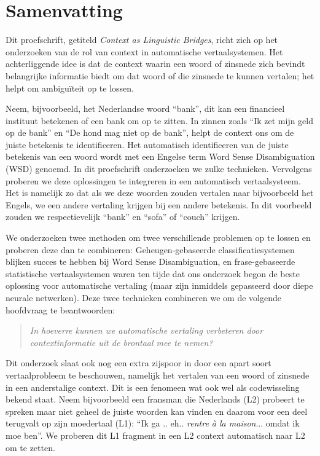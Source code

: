 \chapter*{Samenvatting}

Dit proefschrift, getiteld \emph{Context as Linguistic Bridges}, richt zich op het onderzoeken van de rol van context in
automatische vertaalsystemen. Het achterliggende idee is dat de context waarin een woord of zinsnede zich bevindt
belangrijke informatie biedt om dat woord of die zinsnede te kunnen vertalen; het helpt om ambiguïteit op te lossen.

Neem, bijvoorbeeld, het Nederlandse woord ``bank'', dit kan een financieel instituut betekenen of een bank om op te
zitten. In zinnen zoals ``Ik zet mijn geld op de bank'' en ``De hond mag niet op de bank'', helpt de context ons om de
juiste betekenis te identificeren. Het automatisch identificeren van de juiste betekenis van een woord wordt met een
Engelse term  Word Sense Disambiguation (WSD) genoemd. In dit proefschrift onderzoeken we zulke technieken.
Vervolgens proberen we deze oplossingen te integreren in een automatisch vertaalsysteem. Het is namelijk zo dat als we
deze woorden zouden vertalen naar bijvoorbeeld het Engels, we een andere vertaling krijgen bij een andere betekenis. In
dit voorbeeld zouden we respectievelijk ``bank'' en ``sofa'' of ``couch'' krijgen.

We onderzoeken twee methoden om twee verschillende problemen op te lossen en proberen deze dan te
combineren: Geheugen-gebaseerde classificatiesystemen blijken succes te hebben bij Word Sense Disambiguation, en
frase-gebaseerde statistische vertaalsystemen waren ten tijde dat ons onderzoek begon de beste oplossing voor
automatische vertaling (maar zijn inmiddels gepasseerd door diepe neurale netwerken). Deze twee technieken combineren we
om de volgende hoofdvraag te beantwoorden:

\begin{quote}
\emph{In hoeverre kunnen we automatische vertaling verbeteren door contextinformatie uit de brontaal mee te nemen?}
\end{quote}

Dit onderzoek slaat ook nog een extra zijspoor in door een apart soort vertaalprobleem te beschouwen, namelijk het vertalen
van een woord of zinsnede in een anderstalige context. Dit is een fenomeen wat ook wel als codewisseling bekend staat. Neem
bijvoorbeeld een fransman die Nederlands (L2) probeert te spreken maar niet geheel de juiste woorden kan vinden en
daarom voor een deel terugvalt op zijn moedertaal (L1): ``Ik ga .. eh.. \emph{rentre à la maison}... omdat ik moe ben''.
We proberen dit L1 fragment in een L2 context automatisch naar L2 om te zetten.

